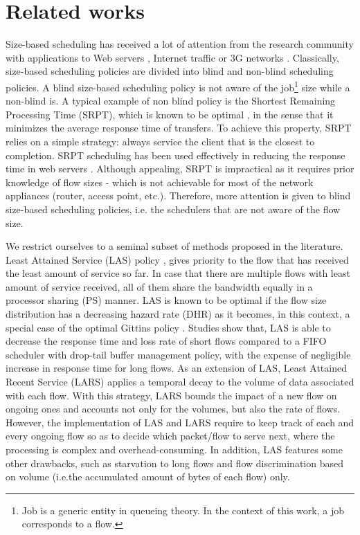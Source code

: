 \documentclass[preprint,12pt]{elsarticle}
\begin{document}
\section{Related works}
\label{sec:related}
Size-based scheduling has received a lot of attention from the research community with applications to Web servers \cite{SRPT_Web2006}, Internet traffic \cite{Avrachenkov04Run2c,Rai2004Performance,Keller2008Improving} or 3G networks \cite{Aalto2007Impact,Lassila2008Combining}. Classically, size-based scheduling policies are divided into blind and non-blind scheduling policies. A blind size-based scheduling policy is not aware of the job\footnote{Job is a generic entity in queueing theory. In the context of this work, a job corresponds to a flow.} size while a non-blind is. A typical example of non blind policy is the Shortest Remaining Processing Time (SRPT), which is known to be optimal \cite{Schrage1968SRPT}, in the sense that it minimizes the average response time of transfers. To achieve this property, SRPT relies on a simple strategy: always service the client that is the closest to completion. SRPT scheduling has been used effectively in reducing the response time in web servers \cite{Chen03cnetworks,Harchol2003}. Although appealing, SRPT is impractical as it requires prior knowledge of flow sizes - which is not achievable for most of the network appliances (router, access point, etc.). Therefore, more attention is given to blind size-based scheduling policies, i.e. the schedulers that are not aware of the flow size.

We restrict ourselves to a seminal subset of methods proposed in the literature. Least Attained Service (LAS) policy \cite{Rai02size-basedscheduling}, gives priority to the flow that has received the least amount of service so far. In case that there are multiple flows with least amount of service received, all of them share the bandwidth equally in a processor sharing (PS) manner. LAS is known to be optimal if the flow size distribution has a decreasing hazard rate (DHR) \cite{Nuyens2008FB} as it becomes, in this context, a special case of the optimal Gittins policy \cite{Gittins89}. Studies \cite{Rai02size-basedscheduling,Rai04size-basedscheduling,Rai04performancemodels} show that, LAS is able to decrease the response time and loss rate of short flows compared to a FIFO scheduler with drop-tail buffer management policy, with the expense of negligible increase in response time for long flows. As an extension of LAS, Least Attained Recent Service (LARS) \cite{Martin10Lars} applies a temporal decay to the volume of data associated with each flow. With this strategy, LARS bounds the impact of a new flow on ongoing ones and accounts not only for the volumes, but also the rate of flows. However, the implementation of LAS and LARS require to keep track of each and every ongoing flow so as to decide which packet/flow to serve next, where the processing is complex and overhead-consuming. In addition, LAS features some other drawbacks, such as starvation to long flows and flow discrimination based on volume (i.e.the accumulated amount of bytes of each flow) only. 
\end{document}
